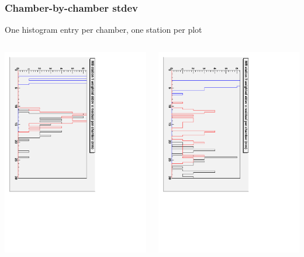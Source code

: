 \documentclass[compress]{beamer}
\begin{document}
\begin{frame}
\frametitle{Chamber-by-chamber stdev}
One histogram entry per chamber, one station per plot

\begin{columns}
\includegraphics[height=\linewidth, angle=90]{stdevs_mb1.pdf}

\includegraphics[height=\linewidth, angle=90]{stdevs_mb3.pdf}


\end{columns}
\end{frame}
\end{document}
